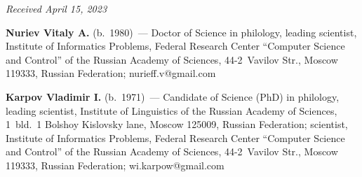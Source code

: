 \begin{multicols}{2}
{{ }
 }

\end{multicols}

\vspace*{-6pt}

\hfill{\small\textit{Received April 15, 2023}} 

\vspace*{-18pt}
    
    
    \Contr
    
    
    \vspace*{-3pt}
    
    \noindent
    \textbf{Nuriev Vitaly A.} (b.\ 1980)~--- Doctor of Science in philology, leading 
scientist, Institute of Informatics Problems, Federal Research Center ``Computer 
Science and Control'' of the Russian Academy of Sciences, 44-2~Vavilov Str., 
Moscow 119333, Russian Federation; \mbox{nurieff.v@gmail.com}
    
    \vspace*{3pt}
    
    \noindent
    \textbf{Karpov Vladimir I.} (b.\ 1971)~--- Candidate of Science (PhD) in 
philology, leading scientist, Institute of Linguistics of the Russian Academy of 
Sciences, 1~bld.~1 Bolshoy Kislovsky lane, Moscow 125009, Russian Federation; 
scientist, Institute of Informatics Problems, Federal Research Center ``Computer 
Science and Control'' of the Russian Academy of Sciences, 44-2~Vavilov Str., 
Moscow 119333, Russian Federation; \mbox{wi.karpow@gmail.com}
     
      
\label{end\stat}

\renewcommand{\bibname}{\protect\rm Литература} 